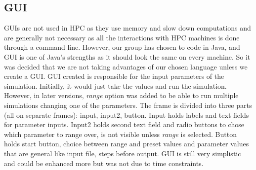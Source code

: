\subsection{GUI}

GUIs are not used in HPC as they use memory and slow down computations and are generally not necessary as all the interactions with HPC machines is done through a command line.
However, our group has chosen to code in Java, and GUI is one of Java's strengths as it should look the same on every machine. So it was decided that we are not taking advantages of our chosen language unless we create a GUI. 
GUI created is responsible for the input parameters of the simulation. Initially, it would just take the values and run the simulation.
However, in later versions, \emph{range} option was added to be able to run multiple simulations changing one of the parameters.
The frame is divided into three parts (all on separate frames): input, input2, button.
Input holds labels and text fields for parameter inputs. 
Input2 holds second text field and radio buttons to chose which parameter to range over, is not visible unless \emph{range} is selected. 
Button holds start button, choice between range and preset values and parameter values that are general like input file, steps before output.
GUI is still very simplistic and could be enhanced more but was not due to time constraints.
